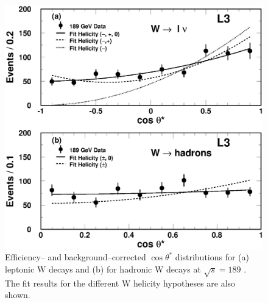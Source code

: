 \documentclass[12pt,a4paper,dvips]{article}
\newlength{\figwidth}
\begin{document}
\newpage
\begin{figure}[htbp]
  \begin{center}
    \includegraphics[width=\figwidth]{wwlongfig2.eps}
  \end{center}
  \caption{Efficiency-- and background--corrected
$\cos \theta^{*}$ distributions for (a) leptonic W decays
and (b) for hadronic W decays at $\sqrt{s}=189$ \GeV{}. The
fit results for the different W helicity hypotheses are also shown.
} 
\label{fig:wwpol2}
\end{figure}
\end{document}
